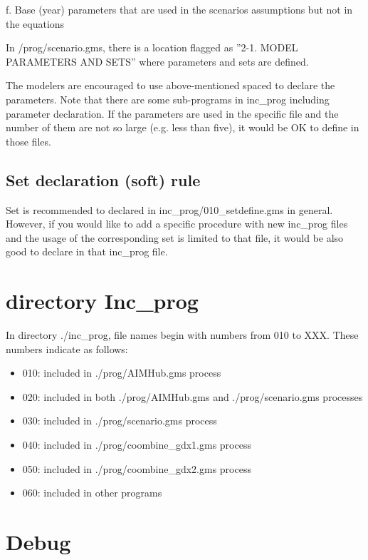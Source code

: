 \documentclass[10pt,a4paper,titlepage,dvipdfmx]{book}
\begin{document}
f. Base (year) parameters that are used in the scenarios assumptions but not in the equations

In /prog/scenario.gms, there is a location flagged as ''2-1. MODEL PARAMETERS AND SETS'' where parameters and sets are defined. 

The modelers are encouraged to use above-mentioned spaced to declare the parameters. Note that there are some sub-programs in inc\_prog including parameter declaration. If the parameters are used in the specific file and the number of them are not so large (e.g. less than five), it would be OK to define in those files.

\subsection{\label{subsec:SetDec}Set declaration (soft) rule}

Set is recommended to declared in inc\_prog/010\_setdefine.gms in general.
However, if you would like to add a specific procedure with new inc\_prog files and the usage of the corresponding set is limited to that file, it would be also good to declare in that inc\_prog file.

\section{\label{sec:IncProg}directory Inc\_prog}

In directory ./inc\_prog, file names begin with numbers from 010 to XXX. These numbers indicate as follows:

\begin{itemize}
  \item 010: included in ./prog/AIMHub.gms process 
  \item 020: included in both ./prog/AIMHub.gms and ./prog/scenario.gms processes 
  \item 030: included in ./prog/scenario.gms process
  \item 040: included in ./prog/coombine\_gdx1.gms process
  \item 050: included in ./prog/coombine\_gdx2.gms process
  \item 060: included in other programs
\end{itemize}
  

\section{\label{sec:Deb}Debug}
\end{document}
